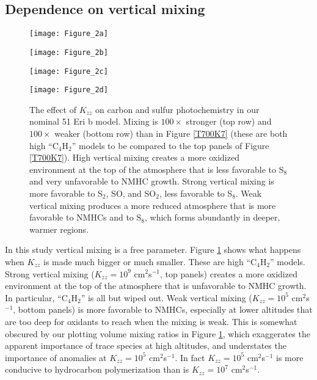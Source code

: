 \documentclass[preprint]{aastex}
\newcounter{reaction}
\begin{document}
\subsection{Dependence on vertical mixing}

\begin{figure}[!htb]
 \centering
 \begin{minipage}[c]{0.49\textwidth}
   \centering
  \texttt{[image: Figure\_2a]} 
 \end{minipage}
 \begin{minipage}[c]{0.49\textwidth}
   \centering
 \texttt{[image: Figure\_2b]} 
 \end{minipage}
 \centering
 \begin{minipage}[c]{0.49\textwidth}
   \centering
 \texttt{[image: Figure\_2c]} 
 \end{minipage}
 \begin{minipage}[c]{0.49\textwidth}
   \centering
 \texttt{[image: Figure\_2d]} 
 \end{minipage}
 \caption{\small The effect of $K_{zz}$ on carbon and sulfur photochemistry in our nominal 51 Eri b model.
Mixing is $100\times$ stronger (top row) and $100\times$ weaker (bottom row) than in Figure \ref{T700K7}
(these are both high ``C$_4$H$_2$'' models to be compared to the top panels of Figure \ref{T700K7}).
High vertical mixing creates a more oxidized environment at the top of the atmosphere
  that is less favorable to S$_8$ and very unfavorable to NMHC growth.  
   Strong vertical mixing is more favorable to S$_2$, SO, and SO$_2$, less favorable to S$_8$. 
  Weak vertical mixing produces a more reduced atmosphere that 
  is more favorable to NMHCs and to S$_8$, which forms abundantly in deeper, warmer regions.
 }
\label{4Kzz}
\end{figure}

In this study vertical mixing is a free parameter.
Figure \ref{4Kzz} shows what happens when $K_{zz}$ is made much bigger or much smaller.
These are high ``C$_4$H$_2$'' models. %
   Strong vertical mixing ($K_{zz}=10^9$ cm$^2$s$^{-1}$, top panels) 
   creates a more oxidized environment at the top of the atmosphere that is unfavorable to NMHC growth.
   In particular, ``C$_4$H$_2$'' is all but wiped out.
  Weak vertical mixing ($K_{zz}=10^5$ cm$^2$s$^{-1}$, bottom panels) is more favorable to NMHCs,
   especially at lower altitudes that are too deep for oxidants to reach when the mixing is weak.
  This is somewhat obscured by our plotting volume mixing ratios in Figure \ref{4Kzz},
  which exaggerates the apparent importance of trace species at high altitudes,
  and understates the importance of anomalies %
  at $K_{zz}=10^5$ cm$^2$s$^{-1}$. 
  In fact $K_{zz}=10^5$ cm$^2$s$^{-1}$ is more conducive to hydrocarbon polymerization than is $K_{zz}=10^7$ cm$^2$s$^{-1}$. 
\end{document}
